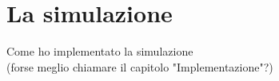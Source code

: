 
\chapter{La simulazione}\label{simulazione} %





Come ho implementato la simulazione 
\\
(forse meglio chiamare il capitolo "Implementazione"?)

\label{analisiLabel}
 

